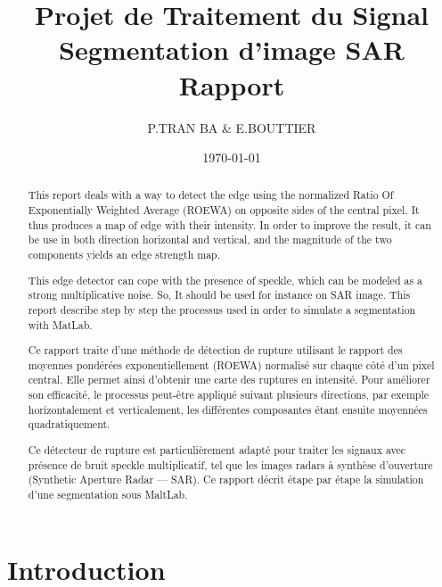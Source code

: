 \documentclass[a4paper,11pt]{article}
\title{Projet de Traitement du Signal\\Segmentation d'image SAR\\Rapport}
\author{P.TRAN BA \& E.BOUTTIER}
\date\today
\begin{document}
\maketitle

\vspace{2cm}

\begin{abstract}

This report deals with a way to detect the edge using the normalized Ratio Of Exponentially Weighted Average (ROEWA) on opposite sides of the central pixel. It thus produces a map of edge with their intensity. In order to improve the result, it can be use in both direction horizontal and vertical, and the magnitude of the two components yields an edge strength map.

This edge detector can cope with the presence of speckle, which can be modeled as a strong multiplicative noise. So, It should be used for instance on SAR image. This report describe step by step the processus used in order to simulate a segmentation with MatLab.

\end{abstract}

\vspace{1cm}

\begin{abstract}

    Ce rapport traite d'une méthode de détection de rupture utilisant le rapport des moyennes pondérées exponentiellement (ROEWA) normalisé sur chaque côté d'un pixel central. Elle permet ainsi d'obtenir une carte des ruptures en intensité. Pour améliorer son efficacité, le processus peut-être appliqué suivant plusieurs directions, par exemple horizontalement et verticalement, les différentes composantes étant ensuite moyennées quadratiquement.

    Ce détecteur de rupture est particulièrement adapté pour traiter les signaux avec présence de bruit speckle multiplicatif, tel que les images radars à synthèse d'ouverture (Synthetic Aperture Radar — SAR). Ce rapport décrit étape par étape la simulation d'une segmentation sous MaltLab.

\end{abstract}

\newpage

\tableofcontents

\newpage

\section{Introduction}
\end{document}
